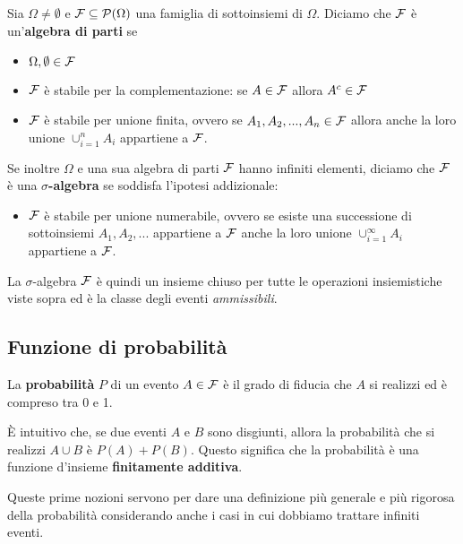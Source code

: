 \begin{definition}
	Sia $\Omega \neq \emptyset$ e $\mathcal{F} \subseteq \mathcal{P}(\Omega)$ una famiglia di sottoinsiemi
	di $\Omega$. Diciamo che $\mathcal{F}$ è un'\textbf{algebra di parti} se
	\begin{itemize}
		\item $\Omega, \emptyset \in \mathcal{F}$
		\item $\mathcal{F}$ è stabile per la complementazione: se $A \in \mathcal{F}$ allora $A^c \in \mathcal{F}$
		\item $\mathcal{F}$ è stabile per unione finita, ovvero se $A_1, A_2, ..., A_n \in \mathcal{F}$ allora
		      anche la loro unione $\cup_{i=1}^n A_i$ appartiene a $\mathcal{F}$.
	\end{itemize}
	Se inoltre $\Omega$ e una sua algebra di parti $\mathcal{F}$ hanno infiniti elementi, diciamo che $\mathcal{F}$
	è una $\sigma$\textbf{-algebra} se soddisfa l'ipotesi addizionale:
	\begin{itemize}
		\item $\mathcal{F}$ è stabile per unione numerabile, ovvero se esiste una successione di
		      sottoinsiemi $A_1, A_2, ...$ appartiene a $\mathcal{F}$ anche la loro unione
		      $\cup_{i=1}^\infty A_i$ appartiene a $\mathcal{F}$.
	\end{itemize}
\end{definition}

La $\sigma$-algebra $\mathcal{F}$ è quindi un insieme chiuso per tutte le operazioni insiemistiche viste
sopra ed è la classe degli eventi \emph{ammissibili}.

\subsection{Funzione di probabilità}
La \textbf{probabilità} $P$ di un evento $A \in \mathcal{F}$ è il grado di fiducia che $A$ si realizzi ed è
compreso tra 0 e 1.

\`E intuitivo che, se due eventi $A$ e $B$ sono disgiunti, allora la probabilità che si realizzi
$A \cup B$ è $P(A) + P(B)$. Questo significa che la probabilità è una funzione d'insieme
\textbf{finitamente additiva}.

Queste prime nozioni servono per dare una definizione più generale e più rigorosa della probabilità
considerando anche i casi in cui dobbiamo trattare infiniti eventi.

